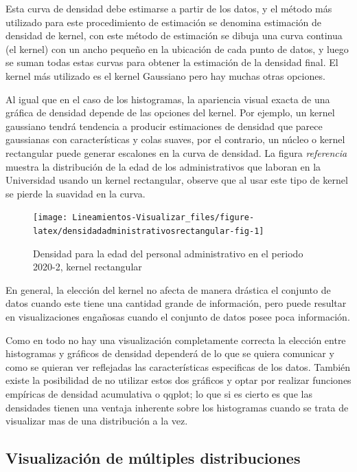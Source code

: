 \documentclass[
]{book}
\begin{document}
Esta curva de densidad debe estimarse a partir de los datos, y el método más utilizado para este procedimiento de estimación se denomina estimación de densidad de kernel, con este método de estimación se dibuja una curva continua (el kernel) con un ancho pequeño en la ubicación de cada punto de datos, y luego se suman todas estas curvas para obtener la estimación de la densidad final. El kernel más utilizado es el kernel Gaussiano pero hay muchas otras opciones.

Al igual que en el caso de los histogramas, la apariencia visual exacta de una gráfica de densidad depende de las opciones del kernel. Por ejemplo, un kernel gaussiano tendrá tendencia a producir estimaciones de densidad que parece gaussianas con características y colas suaves, por el contrario, un núcleo o kernel rectangular puede generar escalones en la curva de densidad. La figura \emph{referencia} muestra la distribución de la edad de los administrativos que laboran en la Universidad usando un kernel rectangular, observe que al usar este tipo de kernel se pierde la suavidad en la curva.

\begin{figure}

{\centering \texttt{[image: Lineamientos-Visualizar\_files/figure-latex/densidadadministrativosrectangular-fig-1]} 

}

\caption{Densidad para la edad del personal administrativo en el periodo 2020-2, kernel rectangular}\label{fig:densidadadministrativosrectangular-fig}
\end{figure}

En general, la elección del kernel no afecta de manera drástica el conjunto de datos cuando este tiene una cantidad grande de información, pero puede resultar en visualizaciones engañosas cuando el conjunto de datos posee poca información.

Como en todo no hay una visualización completamente correcta la elección entre histogramas y gráficos de densidad dependerá de lo que se quiera comunicar y como se quieran ver reflejadas las características especificas de los datos. También existe la posibilidad de no utilizar estos dos gráficos y optar por realizar funciones empíricas de densidad acumulativa o qqplot; lo que si es cierto es que las densidades tienen una ventaja inherente sobre los histogramas cuando se trata de visualizar mas de una distribución a la vez.

\hypertarget{visualizaciuxf3n-de-muxfaltiples-distribuciones}{%
\subsection{Visualización de múltiples distribuciones}\label{visualizaciuxf3n-de-muxfaltiples-distribuciones}}
\end{document}
